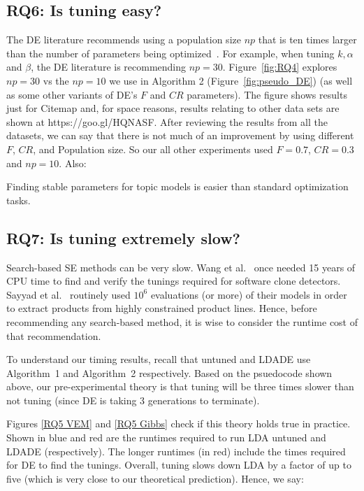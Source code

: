 \documentclass[twocolumn,5p,sort&compress]{elsarticle}
\newcommand{\fig}[1]{Figure~\ref{fig:#1}}
\theoremstyle{break}
\begin{document}
\subsection{\textbf{RQ6: Is  tuning  easy?}}


The DE literature
recommends using a population size $np$ that is ten times larger than the number of parameters being
optimized~\cite{storn1997differential}.  For example, when tuning $k,\alpha$ and $\beta$,
the DE literature is recommending $np=30$.
Figure~\ref{fig:RQ4} explores $np=30$ vs the $np=10$ we use in Algorithm 2 (\fig{pseudo_DE})
(as well as some other variants of DE's $F$ and $CR$ parameters).
The figure shows results just for Citemap and, for space reasons, results
relating to other data sets are shown at https://goo.gl/HQNASF.
After reviewing the results from all the datasets, we can say that there is not much of an improvement by using different $F$, $CR$, and Population size. So our all other experiments used $F=0.7$, $CR=0.3$ and $np = 10$.
Also:

\begin{lesson}
  Finding stable parameters for
  topic models is easier than standard optimization tasks.
\end{lesson}

\subsection{\textbf{RQ7: Is tuning extremely slow?}}

Search-based SE methods can be very slow. Wang et al.~\cite{wang2013searching} once needed 15
years of CPU time to find and verify the tunings required for software
clone detectors. Sayyad et al.~\cite{sayyad2013scalable} routinely used
$10^6$ evaluations (or more) of their models in order to extract
products from highly constrained product
lines. Hence, before recommending any
search-based method, it is wise to consider the runtime cost of that
recommendation.

To understand our timing results, recall that untuned and LDADE use
Algorithm~1 and Algorithm~2 respectively. Based on the psuedocode
shown above, our pre-experimental theory is that
tuning will be three times slower than not tuning (since DE is taking 3 generations to terminate).
 
Figures \ref{RQ5 VEM} and \ref{RQ5 Gibbs} check if this theory
holds true in practice. Shown in blue and red are the
  runtimes required to run LDA untuned and LDADE (respectively).  The
  longer runtimes (in red) include the times required for DE to find
  the tunings. Overall, tuning slows down LDA by a factor of up to
  five (which is very close to our theoretical prediction).
  Hence, we say:
\end{document}

